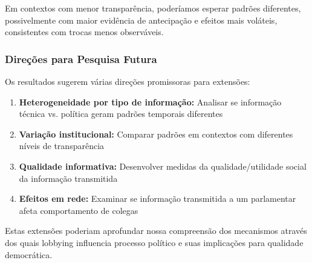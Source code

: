 Em contextos com menor transparência, poderíamos esperar padrões diferentes, possivelmente com maior evidência de antecipação e efeitos mais voláteis, consistentes com trocas menos observáveis.

\subsubsection{Direções para Pesquisa Futura}

Os resultados sugerem várias direções promissoras para extensões:

\begin{enumerate}
\item \textbf{Heterogeneidade por tipo de informação:} Analisar se informação técnica vs. política geram padrões temporais diferentes
\item \textbf{Variação institucional:} Comparar padrões em contextos com diferentes níveis de transparência
\item \textbf{Qualidade informativa:} Desenvolver medidas da qualidade/utilidade social da informação transmitida
\item \textbf{Efeitos em rede:} Examinar se informação transmitida a um parlamentar afeta comportamento de colegas
\end{enumerate}

Estas extensões poderiam aprofundar nossa compreensão dos mecanismos através dos quais lobbying influencia processo político e suas implicações para qualidade democrática.